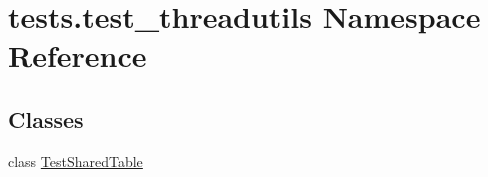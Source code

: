 \hypertarget{namespacetests_1_1test__threadutils}{}\section{tests.\+test\+\_\+threadutils Namespace Reference}
\label{namespacetests_1_1test__threadutils}
\subsection*{Classes}
\begin{DoxyCompactItemize}
\item 
class \hyperlink{classtests_1_1test__threadutils_1_1TestSharedTable}{Test\+Shared\+Table}
\end{DoxyCompactItemize}
